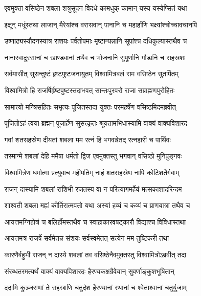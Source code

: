 
\twolineshloka
{एवमुक्ता वसिष्ठेन शबला शत्रुसूदन}
{विदधे कामधुक् कामान् यस्य यस्येप्सितं यथा} %

\twolineshloka
{इक्षून् मधूंस्तथा लाजान् मैरेयांश्च वरासवान्}
{पानानि च महार्हाणि भक्ष्यांश्चोच्चावचानपि} %

\twolineshloka
{उष्णाढ्यस्यौदनस्यात्र राशयः पर्वतोपमाः}
{मृष्टान्यन्नानि सूपांश्च दधिकुल्यास्तथैव च} %

\twolineshloka
{नानास्वादुरसानां च खाण्डवानां तथैव च}
{भोजनानि सुपूर्णानि गौडानि च सहस्रशः} %

\twolineshloka
{सर्वमासीत् सुसन्तुष्टं हृष्टपुष्टजनायुतम्}
{विश्वामित्रबलं राम वसिष्ठेन सुतर्पितम्} %

\twolineshloka
{विश्वामित्रो हि राजर्षिर्हृष्टपुष्टस्तदाभवत्}
{सान्तःपुरवरो राजा सब्राह्मणपुरोहितः} %

\twolineshloka
{सामात्यो मन्त्रिसहितः सभृत्यः पूजितस्तदा}
{युक्तः परमहर्षेण वसिष्ठमिदमब्रवीत्} %

\twolineshloka
{पूजितोऽहं त्वया ब्रह्मन् पूजार्हेण सुसत्कृतः}
{श्रूयतामभिधास्यामि वाक्यं वाक्यविशारद} %

\twolineshloka
{गवां शतसहस्रेण दीयतां शबला मम}
{रत्नं हि भगवन्नेतद् रत्नहारी च पार्थिवः} %

\twolineshloka
{तस्मान्मे शबलां देहि ममैषा धर्मतो द्विज}
{एवमुक्तस्तु भगवान् वसिष्ठो मुनिपुङ्गवः} %

\twolineshloka
{विश्वामित्रेण धर्मात्मा प्रत्युवाच महीपतिम्}
{नाहं शतसहस्रेण नापि कोटिशतैर्गवाम्} %

\twolineshloka
{राजन् दास्यामि शबलां राशिभी रजतस्य वा}
{न परित्यागमर्हेयं मत्सकाशादरिन्दम} %

\twolineshloka
{शाश्वती शबला मह्यं कीर्तिरात्मवतो यथा}
{अस्यां हव्यं च कव्यं च प्राणयात्रा तथैव च} %

\twolineshloka
{आयत्तमग्निहोत्रं च बलिर्होमस्तथैव च}
{स्वाहाकारवषट्कारौ विद्याश्च विविधास्तथा} %

\twolineshloka
{आयत्तमत्र राजर्षे सर्वमेतन्न संशयः}
{सर्वस्वमेतत् सत्येन मम तुष्टिकरी तथा} %

\twolineshloka
{कारणैर्बहुभी राजन् न दास्ये शबलां तव}
{वसिष्ठेनैवमुक्तस्तु विश्वामित्रोऽब्रवीत् तदा} %

\twolineshloka
{संरब्धतरमत्यर्थं वाक्यं वाक्यविशारदः}
{हैरण्यकक्षग्रैवेयान् सुवर्णाङ्कुशभूषितान्} %

\twolineshloka
{ददामि कुञ्जराणां ते सहस्राणि चतुर्दश}
{हैरण्यानां रथानां च श्वेताश्वानां चतुर्युजाम्} %

